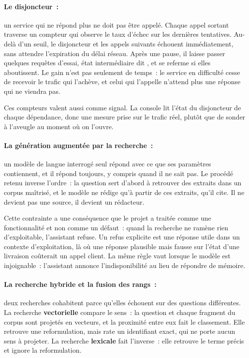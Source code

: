 \paragraph{Le disjoncteur~:} un service qui ne répond plus ne doit pas être appelé. Chaque appel
sortant traverse un compteur qui observe le taux d'échec sur les dernières tentatives. Au-delà d'un
seuil, le disjoncteur  et les appels suivants échouent immédiatement, sans attendre
l'expiration du délai réseau. Après une pause, il laisse passer quelques requêtes d'essai, état
intermédiaire dit , et se referme si elles aboutissent. Le gain n'est pas
seulement de temps~: le service en difficulté cesse de recevoir le trafic qui l'achève, et celui qui
l'appelle n'attend plus une réponse qui ne viendra pas.

Ces compteurs valent aussi comme signal. La console lit l'état du disjoncteur de chaque dépendance,
donc une mesure prise sur le trafic réel, plutôt que de sonder à l'aveugle au moment où on l'ouvre.

\paragraph{La génération augmentée par la recherche~:} un modèle de langue interrogé seul répond avec
ce que ses paramètres contiennent, et il répond toujours, y compris quand il ne sait pas. Le procédé
retenu inverse l'ordre~: la question sert d'abord à retrouver des extraits dans un corpus maîtrisé,
et le modèle ne rédige qu'à partir de ces extraits, qu'il cite. Il ne devient pas une source, il
devient un rédacteur.

Cette contrainte a une conséquence que le projet a traitée comme une fonctionnalité et non comme un
défaut~: quand la recherche ne ramène rien d'exploitable, l'assistant refuse. Un refus explicite est
une réponse utile dans un contexte d'exploitation, là où une réponse plausible mais fausse sur l'état
d'une livraison coûterait un appel client. La même règle vaut lorsque le modèle est injoignable~:
l'assistant annonce l'indisponibilité au lieu de répondre de mémoire.

\paragraph{La recherche hybride et la fusion des rangs~:} deux recherches cohabitent parce qu'elles
échouent sur des questions différentes. La recherche \textbf{vectorielle} compare le sens~: la
question et chaque fragment du corpus sont projetés en vecteurs, et la proximité entre eux fait le
classement. Elle retrouve une reformulation, mais rate un identifiant exact, qui ne porte aucun sens
à projeter. La recherche \textbf{lexicale} fait l'inverse~: elle retrouve le terme précis et ignore
la reformulation.

